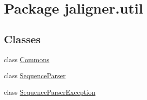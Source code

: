 \hypertarget{namespacejaligner_1_1util}{\section{Package jaligner.\+util}
\label{namespacejaligner_1_1util}
}
\subsection*{Classes}
\begin{DoxyCompactItemize}
\item 
class \hyperlink{classjaligner_1_1util_1_1_commons}{Commons}
\item 
class \hyperlink{classjaligner_1_1util_1_1_sequence_parser}{Sequence\+Parser}
\item 
class \hyperlink{classjaligner_1_1util_1_1_sequence_parser_exception}{Sequence\+Parser\+Exception}
\end{DoxyCompactItemize}
